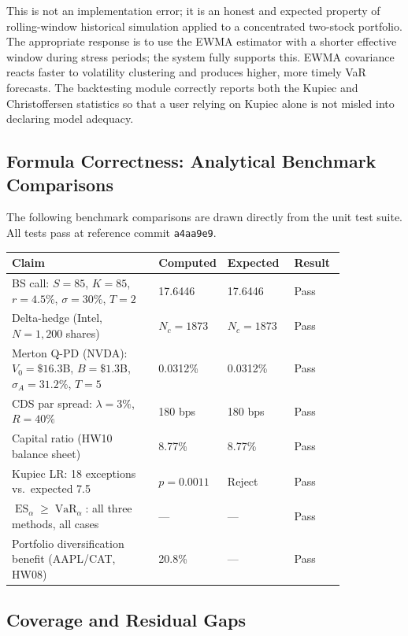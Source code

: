 \documentclass[11pt]{article}
\newcommand{\code}[1]{\texttt{#1}}
\DeclareMathOperator{\VaR}{VaR}
\DeclareMathOperator{\ES}{ES}
\begin{document}
This is not an implementation error; it is an honest and expected property of
rolling-window historical simulation applied to a concentrated two-stock
portfolio.  The appropriate response is to use the EWMA estimator with a shorter
effective window during stress periods; the system fully supports this.
EWMA covariance reacts faster to volatility clustering and produces higher,
more timely VaR forecasts.  The backtesting module correctly reports both the
Kupiec and Christoffersen statistics so that a user relying on Kupiec alone is
not misled into declaring model adequacy.

\subsection{Formula Correctness: Analytical Benchmark Comparisons}

The following benchmark comparisons are drawn directly from the unit test suite.
All tests pass at reference commit \code{a4aa9e9}.

\begin{center}
\begin{tabular}{@{}L{0.44\linewidth}L{0.20\linewidth}L{0.20\linewidth}l@{}}
\toprule
Claim & Computed & Expected & Result \\
\midrule
BS call: $S{=}85$, $K{=}85$, $r{=}4.5\%$,
         $\sigma{=}30\%$, $T{=}2$
  & 17.6446 & 17.6446 & Pass \\[2pt]
Delta-hedge (Intel, $N{=}1{,}200$ shares)
  & $N_c = 1873$ & $N_c = 1873$ & Pass \\[2pt]
Merton Q-PD (NVDA): $V_0{=}\$16.3$B, $B{=}\$1.3$B,
         $\sigma_A{=}31.2\%$, $T{=}5$
  & 0.0312\% & 0.0312\% & Pass \\[2pt]
CDS par spread: $\lambda{=}3\%$, $R{=}40\%$
  & 180 bps & 180 bps & Pass \\[2pt]
Capital ratio (HW10 balance sheet)
  & 8.77\% & 8.77\% & Pass \\[2pt]
Kupiec LR: 18 exceptions vs.\ expected 7.5
  & $p = 0.0011$ & Reject & Pass \\[2pt]
$\ES_\alpha \geq \VaR_\alpha$: all three methods, all cases
  & --- & --- & Pass \\[2pt]
Portfolio diversification benefit (AAPL/CAT, HW08)
  & 20.8\% & --- & Pass \\
\bottomrule
\end{tabular}
\end{center}

\subsection{Coverage and Residual Gaps}
\end{document}
